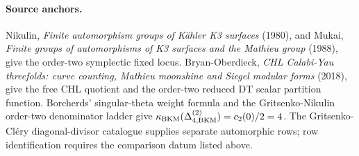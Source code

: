 \paragraph{Source anchors.}
Nikulin, \emph{Finite automorphism groups of K\"ahler K3 surfaces}
(1980), and Mukai, \emph{Finite groups of automorphisms of K3 surfaces
and the Mathieu group} (1988), give the order-two symplectic fixed
locus.  Bryan-Oberdieck, \emph{CHL Calabi-Yau threefolds: curve
counting, Mathieu moonshine and Siegel modular forms} (2018), give the
free CHL quotient and the order-two reduced DT scalar partition
function.  Borcherds' singular-theta weight formula and the
Gritsenko-Nikulin order-two denominator ladder give
$\kappa_{\mathrm{BKM}}(\Delta^{(2)}_{4,\mathrm{BKM}})=c_2(0)/2=4$.  The Gritsenko-Cl\'ery
diagonal-divisor catalogue supplies separate automorphic rows; row
identification requires the comparison datum listed above.
